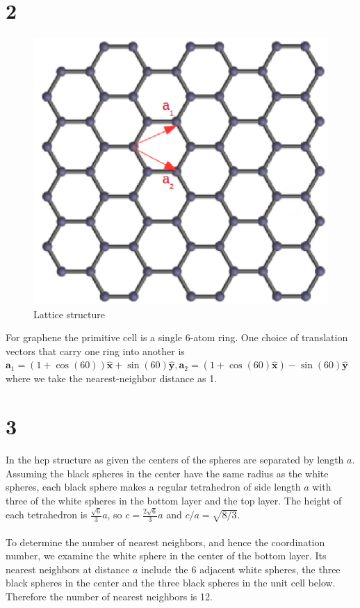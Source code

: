 \documentclass[a4paper,11pt]{article}
\numberwithin{equation}{section}
\newcommand{\bv}[1]{\mathbf{#1}}
\begin{document}
\section*{2}
\begin{figure}[h]
 \caption{Lattice structure}
 \centering
   \includegraphics[width=\textwidth]{p2}
\end{figure}
For graphene the primitive cell is a single 6-atom ring. 
One choice of translation vectors that carry one ring into another is $\bv{a}_1=(1+\cos{(60)})\bv{\hat{x}}+\sin{(60)}\bv{\hat{y}}, \bv{a}_2=(1+\cos{(60)}\bv{\hat{x}})-\sin{(60)}\bv{\hat{y}}$ where we take the nearest-neighbor distance as 1. 

\section*{3}
In the hcp structure as given the centers of the spheres are separated by length $a$. 
Assuming the black spheres in the center have the same radius as the white spheres, each black sphere makes a regular tetrahedron of side length $a$ with three of the white spheres in the bottom layer and the top layer.
The height of each tetrahedron is $\frac{\sqrt{6}}{3}a$, so $c=\frac{2\sqrt{6}}{3}a$ and $c/a = \sqrt{8/3}$.\\
\\
To determine the number of nearest neighbors, and hence the coordination number, we examine the white sphere in the center of the bottom layer.
Its nearest neighbors at distance $a$ include the 6 adjacent white spheres, the three black spheres in the center and the three black spheres in the unit cell below.
Therefore the number of nearest neighbors is 12.
\end{document}
